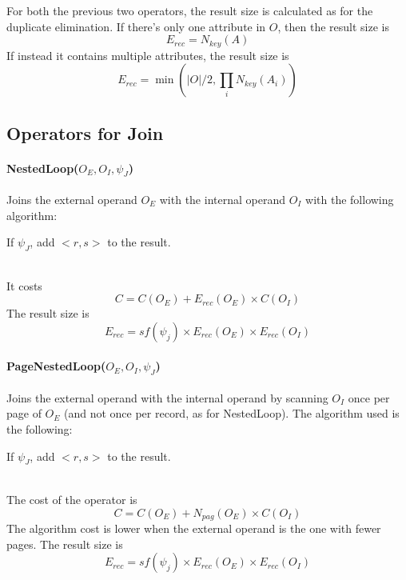 For both the previous two operators, the result size is calculated as for the duplicate elimination. If there's only one attribute in $O$, then the result size is
\begin{equation*}
    E_{rec} = N_{key}(A)
\end{equation*}
If instead it contains multiple attributes, the result size is
\begin{equation*}
    E_{rec} = \min(|O|/2, \prod_i N_{key}(A_i))
\end{equation*}

\subsection{Operators for Join}

\paragraph{NestedLoop($O_E, O_I, \psi_J$)}
Joins the external operand $O_E$ with the internal operand $O_I$ with the following algorithm:
\begin{algorithm}
\begin{algorithmic}
            \State If $\psi_J$, add $<r,s>$ to the result.
        \EndFor
    \EndFor
\end{algorithmic}
\end{algorithm} \\
It costs
\begin{equation*}
    C = C(O_E) + E_{rec}(O_E) \times C(O_I)
\end{equation*}
The result size is
\begin{equation*}
    E_{rec} = sf(\psi_j) \times E_{rec}(O_E) \times E_{rec}(O_I)
\end{equation*}

\paragraph{PageNestedLoop($O_E, O_I, \psi_J$)}
Joins the external operand with the internal operand by scanning $O_I$ once per page of $O_E$ (and not once per record, as for NestedLoop). The algorithm used is the following:
\begin{algorithm}
\begin{algorithmic}
                    \State If $\psi_J$, add $<r,s>$ to the result. 
                \EndFor
            \EndFor
        \EndFor
    \EndFor
\end{algorithmic}
\end{algorithm} \\
The cost of the operator is
\begin{equation*}
    C = C(O_E) + N_{pag}(O_E) \times C(O_I)
\end{equation*}
The algorithm cost is lower when the external operand is the one with fewer pages.
The result size is
\begin{equation*}
    E_{rec} = sf(\psi_j) \times E_{rec}(O_E) \times E_{rec}(O_I)
\end{equation*}

